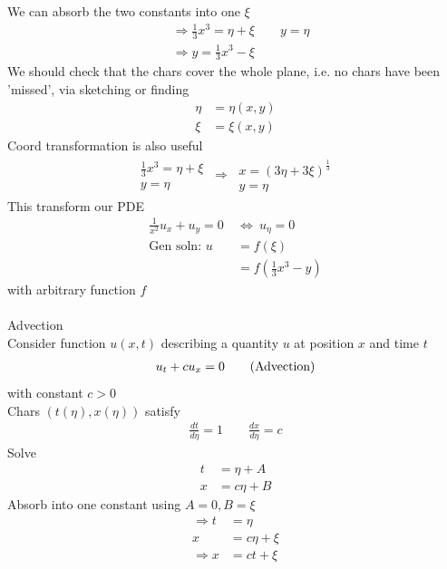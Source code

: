 \documentclass[12pt, letterpaper]{article}
\begin{document}
We can absorb the two constants into one $\xi$
\begin{align*}
    &\Rightarrow \frac 13 x^3 = \eta + \xi \qquad y = \eta \\
    &\Rightarrow y = \frac 13 x^3 - \xi
\end{align*}
We should check that the chars cover the whole plane, i.e. no chars have been 'missed', via 
sketching or finding 
\begin{align*}
    \eta &= \eta(x,y) \\
    \xi &= \xi(x,y)
\end{align*} 
Coord transformation is also useful
\begin{align*}
    \begin{matrix}
        \frac 13 x^3 = \eta + \xi \\
        y = \eta
    \end{matrix}\ \Rightarrow \ 
    \begin{matrix}
        x = (3\eta + 3\xi)^\frac 13 \\
        y = \eta
    \end{matrix}
\end{align*}
This transform our PDE
\begin{align*}
    \frac 1{x^2}u_x + u_y = 0\ &\Leftrightarrow\ u_\eta = 0 \\
    \text{Gen soln: } u &= f(\xi) \\
    &= f(\frac 13 x^3 - y)
\end{align*}
with arbitrary function $f$ \\ \\
 Advection \\
Consider function $u(x,t)$ describing a quantity $u$ at position $x$ and time $t$
\begin{align*}
    u_t + cu_x = 0 \tag{\text{Advection}}
\end{align*}
with constant $c > 0$ \\
Chars $(t(\eta), x(\eta))$ satisfy 
\begin{align*}
    \frac{dt}{d\eta} = 1 \qquad \frac{dx}{d\eta} = c
\end{align*}
Solve 
\begin{align*}
    t &= \eta + A \\
    x &= c\eta + B
\end{align*}
Absorb into one constant using $A = 0, B = \xi$
\begin{align*}
    \Rightarrow t &= \eta \\
    x &=c\eta + \xi \\
    \Rightarrow x &= ct + \xi
\end{align*}
\end{document}
